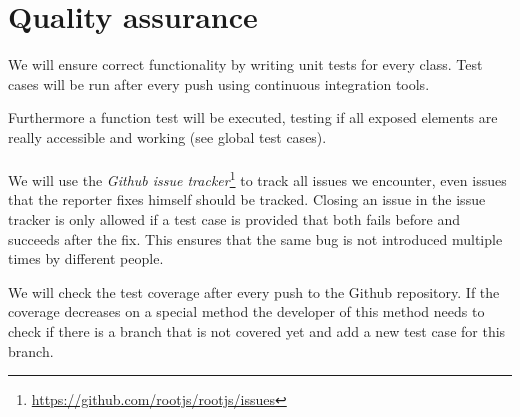 \chapter{Quality assurance}
We will ensure correct functionality by writing unit tests for every class. Test cases will be run after every push using continuous integration tools.

Furthermore a function test will be executed, testing if all exposed elements are really accessible and working (see global test cases).
\\\\

We will use the \textit{Github issue tracker}\footnote{\url{https://github.com/rootjs/rootjs/issues}} to track all issues we encounter, even issues that the reporter fixes himself should be tracked.
Closing an issue in the issue tracker is only allowed if a test case is provided that both fails before and succeeds after the fix. This ensures that the same bug is not introduced multiple times by different people.

We will check the test coverage after every push to the Github repository. If the coverage decreases on a special method the developer of this method needs to check if there is a branch that is not covered yet and add a new test case for this branch.
